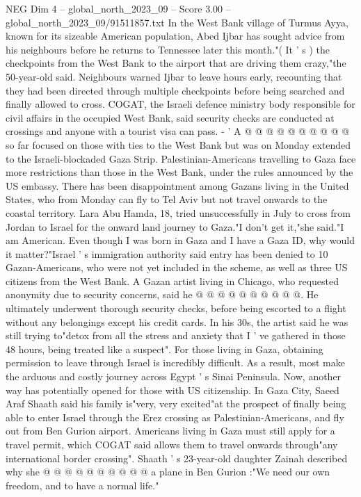 \begin{textsample}{NEG Dim 4 – global\_north\_2023\_09 – Score 3.00 – global\_north\_2023\_09/91511857.txt}
In the West Bank village of Turmus Ayya, known for its sizeable American population, Abed Ijbar has sought advice from his neighbours before he returns to Tennessee later this month."( It ' s ) the checkpoints from the West Bank to the airport that are driving them crazy,"the 50-year-old said.
Neighbours warned Ijbar to leave hours early, recounting that they had been directed through multiple checkpoints before being searched and finally allowed to cross.
COGAT, the Israeli defence ministry body responsible for civil affairs in the occupied West Bank, said security checks are conducted at crossings and anyone with a tourist visa can pass. - ' A @ @ @ @ @ @ @ @ @ @ so far focused on those with ties to the West Bank but was on Monday extended to the Israeli-blockaded Gaza Strip.
Palestinian-Americans travelling to Gaza face more restrictions than those in the West Bank, under the rules announced by the US embassy.
There has been disappointment among Gazans living in the United States, who from Monday can fly to Tel Aviv but not travel onwards to the coastal territory.
Lara Abu Hamda, 18, tried unsuccessfully in July to cross from Jordan to Israel for the onward land journey to Gaza."I don't get it,"she said."I am American.
Even though I was born in Gaza and I have a Gaza ID, why would it matter?"Israel ' s immigration authority said entry has been denied to 10 Gazan-Americans, who were not yet included in the scheme, as well as three US citizens from the West Bank.
A Gazan artist living in Chicago, who requested anonymity due to security concerns, said he @ @ @ @ @ @ @ @ @ @.
He ultimately underwent thorough security checks, before being escorted to a flight without any belongings except his credit cards.
In his 30s, the artist said he was still trying to"detox from all the stress and anxiety that I ' ve gathered in those 48 hours, being treated like a suspect".
For those living in Gaza, obtaining permission to leave through Israel is incredibly difficult.
As a result, most make the arduous and costly journey across Egypt ' s Sinai Peninsula.
Now, another way has potentially opened for those with US citizenship.
In Gaza City, Saeed Araf Shaath said his family is"very, very excited"at the prospect of finally being able to enter Israel through the Erez crossing as Palestinian-Americans, and fly out from Ben Gurion airport.
Americans living in Gaza must still apply for a travel permit, which COGAT said allows them to travel onwards through"any international border crossing".
Shaath ' s 23-year-old daughter Zainah described why she @ @ @ @ @ @ @ @ @ @ a plane in Ben Gurion :"We need our own freedom, and to have a normal life."

\end{textsample}
